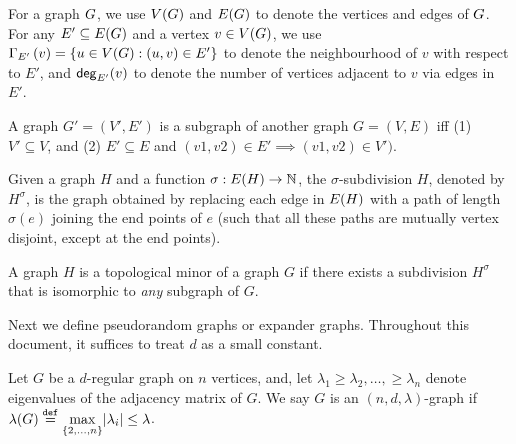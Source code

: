 \documentclass[11pt]{article}
\newcommand{\EnDeeLambda}{(n, d, \lambda)}
\newcommand{\Subdivision}[2]{{#1}^{#2}}
\newcommand{\ExpansionFactor}[1]{\lambda(#1)}
\begin{document}
For a graph $G$, we use $V(G)$ and $E(G)$ to denote the vertices and edges of $G$. 
For any $E' \subseteq E(G)$ and a vertex $v \in V(G)$, we use $\Gamma_{E'}\left(v\right) = \{ u \in V(G) : (u,v) \in E' \}$ to denote the neighbourhood of $v$ with respect to $E'$, and $\mathsf{deg}_{E'}(v)$ to denote the number of vertices adjacent to $v$ via edges in $E'$.

\begin{definition}[Subgraph]\label{def:subgraph}
A graph $G'=(V', E')$ is a subgraph of another graph $G=(V, E)$ iff (1) $V'\subseteq V$, and (2) $E'\subseteq E$ and  $(v1, v2) \in E' \implies (v1, v2) \in V')$.
	
\end{definition}

\begin{definition}\label{def:subdivisions}
Given a graph $H$ and a function $\sigma: E(H) \rightarrow \mathbb{N}$, the $\sigma$-subdivision $H$, denoted by $\Subdivision{H}{\sigma}$, is the graph obtained by replacing each edge in $E(H)$ with a path of length $\sigma(e)$ joining the end points of $e$ (such that all these paths are mutually vertex disjoint, except at the end points).	
\end{definition}

\begin{definition}\label{def:topological-minor}
A graph $H$ is a topological minor of a graph $G$ if there exists a subdivision $\Subdivision{H}{\sigma}$ that is isomorphic to \emph{any} subgraph of $G$.	
\end{definition}

Next we define pseudorandom graphs or expander graphs. 
Throughout this document, it suffices to treat $d$ as a small constant.

\begin{definition}[$\EnDeeLambda$ pseudorandom graphs]\label{def:expander-graphs}
Let $G$ be a $d$-regular graph on $n$ vertices, and, let $\lambda_1 \geq \lambda_2, \dots, \geq \lambda_n$ denote eigenvalues of the adjacency matrix of $G$.
We say $G$ is an $\EnDeeLambda$-graph if $\ExpansionFactor{\Graph} \Def \underset{{\{2, \dots, n\}}}{\max}|\lambda_i| \leq \lambda$.
\end{definition}


\begin{lemma}\label{lemma:expanders-mixing-lemma}
	
\end{lemma}
\end{document}
